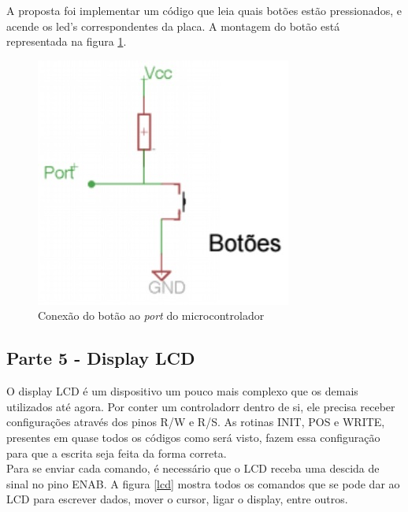 \documentclass[
    a4paper,
    brazil
    ]{article}
\begin{document}
        A proposta foi implementar um código que leia quais botões estão pressionados, e acende os led's correspondentes da placa. A montagem do botão está representada na figura \ref{button_cn}.\\
        
        \begin{figure}[H]
            \centering
            \includegraphics[scale=1]
            {imagens/button_cn.jpg}
            \caption{Conexão do botão ao \emph{port} do microcontrolador}
            \label{button_cn}
        \end{figure}
        
    \subsection{Parte 5 - Display LCD}
        
        O display LCD é um dispositivo um pouco mais complexo que os demais utilizados até agora. Por conter um controladorr dentro de si, ele precisa receber configurações através dos pinos R/W e R/S. As rotinas INIT, POS e WRITE, presentes em quase todos os códigos como será visto, fazem essa configuração para que a escrita seja feita da forma correta.\\
        
        Para se enviar cada comando, é necessário que o LCD receba uma descida de sinal no pino ENAB. A figura \ref{lcd} mostra todos os comandos que se pode dar ao LCD para escrever dados, mover o cursor, ligar o display, entre outros.\\
\end{document}
